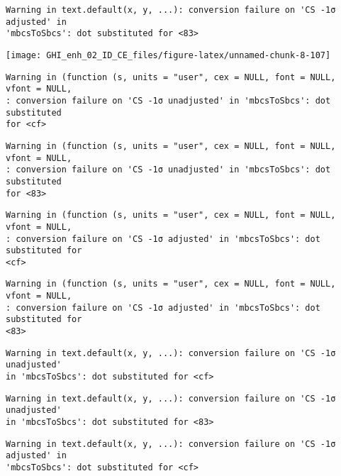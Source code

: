 \documentclass[
  10pt,
  a4paper,oneside]{article}
\begin{document}
\begin{verbatim}
Warning in text.default(x, y, ...): conversion failure on 'CS -1σ adjusted' in
'mbcsToSbcs': dot substituted for <83>
\end{verbatim}

\begin{center}\texttt{[image: GHI\_enh\_02\_ID\_CE\_files/figure-latex/unnamed-chunk-8-107]} \end{center}

\begin{verbatim}
Warning in (function (s, units = "user", cex = NULL, font = NULL, vfont = NULL,
: conversion failure on 'CS -1σ unadjusted' in 'mbcsToSbcs': dot substituted
for <cf>
\end{verbatim}

\begin{verbatim}
Warning in (function (s, units = "user", cex = NULL, font = NULL, vfont = NULL,
: conversion failure on 'CS -1σ unadjusted' in 'mbcsToSbcs': dot substituted
for <83>
\end{verbatim}

\begin{verbatim}
Warning in (function (s, units = "user", cex = NULL, font = NULL, vfont = NULL,
: conversion failure on 'CS -1σ adjusted' in 'mbcsToSbcs': dot substituted for
<cf>
\end{verbatim}

\begin{verbatim}
Warning in (function (s, units = "user", cex = NULL, font = NULL, vfont = NULL,
: conversion failure on 'CS -1σ adjusted' in 'mbcsToSbcs': dot substituted for
<83>
\end{verbatim}

\begin{verbatim}
Warning in text.default(x, y, ...): conversion failure on 'CS -1σ unadjusted'
in 'mbcsToSbcs': dot substituted for <cf>
\end{verbatim}

\begin{verbatim}
Warning in text.default(x, y, ...): conversion failure on 'CS -1σ unadjusted'
in 'mbcsToSbcs': dot substituted for <83>
\end{verbatim}

\begin{verbatim}
Warning in text.default(x, y, ...): conversion failure on 'CS -1σ adjusted' in
'mbcsToSbcs': dot substituted for <cf>
\end{verbatim}
\end{document}
